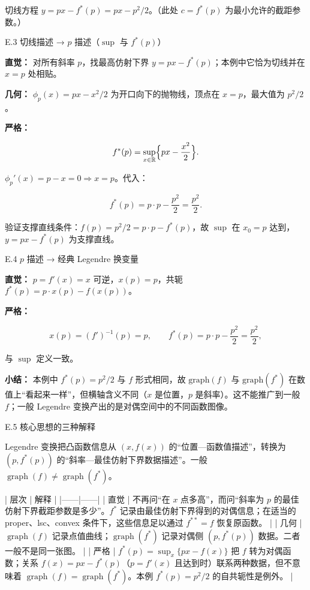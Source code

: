 \documentclass[
    lang=cn,
    color=blue,
    mode=fancy,
    thmcnt=section,
    scheme=chinese
]{elegantbook}
\begin{document}
切线方程 $y = px - f^*(p) = px - p^2/2$。（此处 $c = f^*(p)$ 为最小允许的截距参数。）

\par
E.3 切线描述 → $p$ 描述（$\sup$ 与 $f^*(p)$）

\textbf{直觉：} 对所有斜率 $p$，找最高仿射下界 $y = px - f^*(p)$；本例中它恰为切线并在 $x = p$ 处相贴。

\textbf{几何：} $\phi_p(x) = px - x^2/2$ 为开口向下的抛物线，顶点在 $x = p$，最大值为 $p^2/2$。

\textbf{严格：}

\[
f^*(p) = \sup_{x \in \mathbb{R}} \Bigl\{ px - \frac{x^2}{2} \Bigr\}.
\]

$\phi_p'(x) = p - x = 0 \Rightarrow x = p$。代入：

\[
f^*(p) = p \cdot p - \frac{p^2}{2} = \frac{p^2}{2}.
\]

验证支撑直线条件：$f(p) = p^2/2 = p \cdot p - f^*(p)$，故 $\sup$ 在 $x_0 = p$ 达到，$y = px - f^*(p)$ 为支撑直线。

\par
E.4 $p$ 描述 → 经典 Legendre 换变量

\textbf{直觉：} $p = f'(x) = x$ 可逆，$x(p) = p$，共轭 $f^*(p) = p \cdot x(p) - f(x(p))$。

\textbf{严格：}

\[
x(p) = (f')^{-1}(p) = p, \qquad f^*(p) = p \cdot p - \frac{p^2}{2} = \frac{p^2}{2},
\]

与 $\sup$ 定义一致。

\textbf{小结：} 本例中 $f^*(p)=p^2/2$ 与 $f$ 形式相同，故 $\mathrm{graph}(f)$ 与 $\mathrm{graph}(f^*)$ 在数值上“看起来一样”，但横轴含义不同（$x$ 是位置，$p$ 是斜率）。这不能推广到一般 $f$；一般 Legendre 变换产出的是对偶空间中的不同函数图像。

\par
E.5 核心思想的三种解释

Legendre 变换把凸函数信息从 $(x,f(x))$ 的“位置—函数值描述”，转换为 $(p,f^{\ast}(p))$ 的“斜率—最佳仿射下界数据描述”。一般 $\operatorname{graph}(f)\neq\operatorname{graph}(f^{\ast})$。

| 层次 | 解释 |
|------|------|
| 直觉 | 不再问“在 $x$ 点多高”，而问“斜率为 $p$ 的最佳仿射下界截距参数是多少”。$f^{\ast}$ 记录由最佳仿射下界得到的对偶信息；在适当的 proper、lsc、convex 条件下，这些信息足以通过 $f^{\ast\ast}=f$ 恢复原函数。 |
| 几何 | $\operatorname{graph}(f)$ 记录点值曲线；$\operatorname{graph}(f^{\ast})$ 记录对偶侧 $(p, f^{\ast}(p))$ 数据。二者一般不是同一张图。 |
| 严格 | $f^{\ast}(p)=\sup_x\{px-f(x)\}$ 把 $f$ 转为对偶函数；关系 $f(x)=px-f^{\ast}(p)$（$p=f'(x)$ 且达到时）联系两种数据，但不意味着 $\operatorname{graph}(f)=\operatorname{graph}(f^{\ast})$。本例 $f^{\ast}(p)=p^2/2$ 的自共轭性是例外。 |
\end{document}
